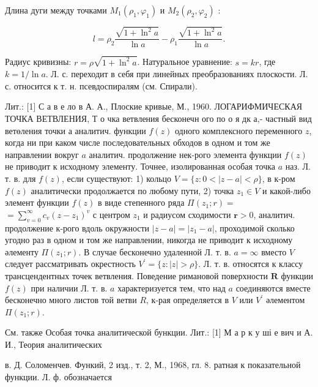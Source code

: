 \documentclass[10pt]{article}
\begin{document}
Длина дуги между точками $M_{1}\left(\rho_{1}, \varphi_{1}\right)$ и $M_{2}\left(\rho_{2}, \varphi_{2}\right)$ :



\[

l=\rho_{2} \frac{\sqrt{1+\ln ^{2} a}}{\ln a}-\rho_{1} \frac{\sqrt{1+\ln ^{2} a}}{\ln a} .

\]



Радиус кривизны: $r=\rho \sqrt{1+\ln ^{2} a}$. Натуральное уравнение: $s=k r$, где $k=1 / \ln a$. Л. с. переходит в себя при линейных преобразованиях плоскости. Л. с. относится к т. н. псевдоспиралям (см. Спирали).



Лит.: [1] С а в е ло в А. А., Плоские кривые, М., 1960. ЛОГАРИФМИЧЕСКАЯ ТОЧКА ВЕТВЛЕНИЯ, Т о чка ветвления бесконечн ого по о я дк а,- частный вид ветөления точки а аналитич. функции $f(z)$ одного комплексного переменного $z$, когда ни при каком числе последовательных обходов в одном и том же направлении вокруг $a$ аналитич. продолжение нек-рого элемента функции $f(z)$ не приводит к исходному элементу. Точнее, изолированная особая точка $a$ наз. Л. т. в. для $f(z)$, если существуют: 1) кольцо $V=\{z: 0<|z-a|<\rho\}$, в к-ром $f(z)$ аналитически продолжается по любому пути, 2) точка $z_{1} \in V$ и какой-либо элемент функции $f(z)$ в виде степенного ряда $\Pi\left(z_{1} ; r\right)=$ $=\sum_{v=0}^{\infty} c_{v}\left(z-z_{1}\right)^{v}$ с центром $z_{1}$ и радиусом сходимости $\boldsymbol{r}>0$, аналитич. продолжение к-рого вдоль окружности $|z-a|=\left|z_{1}-a\right|$, проходимой сколько угодно раз в одном и том же направлении, никогда не приводит к исходному әлементу $\Pi\left(z_{1} ; r\right)$. В случае бесконечно удаленной Л. т. в. $a=\infty$ вместо $V$ следует рассматривать окрестность $V^{\prime}=\{z:|z|>\rho\}$. Л. т. в. относятся к классу трансцендентных точек ветвления. Поведение римановой поверхности $\boldsymbol{R}$ функции $f(z)$ при наличии Л. т. в. $a$ характеризуется тем, что над $a$ соединяются вместе бесконечно много листов той ветви $R$, к-рая определяется в $V$ или $V^{\prime}$ әлементом $\Pi\left(z_{1} ; r\right)$.



См. также Особая точка аналитической бункции. Лит.: [1] М а р к у ші е вич и А. И., Теория аналитических

в. Д. Соломенчев. Функий, 2 изд., т. 2, М., 1968, гл. 8. ратная к показательной функции. Л. ф. обозначается
\end{document}
